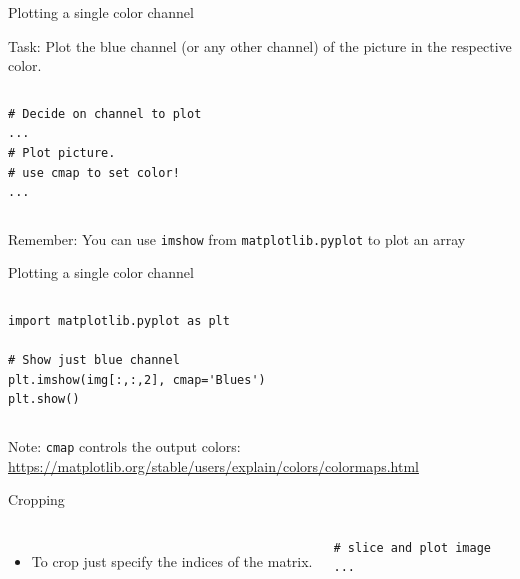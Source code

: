 \documentclass[compress%
,aspectratio=169%
]{beamer}
\newcommand{\code}{\lstinline}
\begin{document}
\begin{frame}[fragile]{Plotting a single color channel}

\alert{Task:} Plot the blue channel (or any other channel) of the picture in the respective color.
\vspace{-0.5cm}
\begin{columns}
\begin{lstlisting}
# Decide on channel to plot
...
# Plot picture. 
# use cmap to set color!
...
\end{lstlisting}
 \centering
\end{columns}\vspace{-0.5cm}
\begin{alertblock}{Remember:}
You can use \code{imshow} from \texttt{matplotlib.pyplot} to plot an array
\end{alertblock}
\end{frame}


\begin{frame}[fragile]{Plotting a single color channel}
\begin{columns}
\begin{lstlisting}
import matplotlib.pyplot as plt

# Show just blue channel
plt.imshow(img[:,:,2], cmap='Blues')
plt.show()
\end{lstlisting}
 \centering
\end{columns}\vspace{-0.5cm}
\begin{alertblock}{Note:}
\texttt{cmap} controls the output colors: \url{https://matplotlib.org/stable/users/explain/colors/colormaps.html}
\end{alertblock}
\end{frame}

\begin{frame}[fragile]{Cropping}

\begin{columns}
 \begin{itemize}
    \item To crop just specify the indices of the matrix.
\end{itemize}
\begin{lstlisting}
# slice and plot image
...
\end{lstlisting}
 \centering
\end{columns}
\end{frame}
\end{document}
